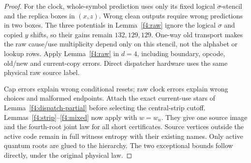 \begin{proof}
For the clock, whole-symbol prediction uses only its fixed logical
\(\sigma\)-stencil and the replica boxes in \((x,z)\). Wrong clean
outputs require wrong predictions in two boxes. The three potentials in
Lemma~\ref{f4:raw} ignore the logical \(\sigma\) and copied \(y\)
shifts, so their gains remain \(132,129,129\). One-way old transport
makes the raw cause/use multiplicity depend only on this stencil,
not the alphabet or lookup rows. Apply Lemma~\ref{f4:raw} in \(d=4\),
including boundary, opcode, old/new and current-copy errors.
Direct dispatcher hardware uses the same physical raw source label.

Cap errors explain wrong conditional resets; raw clock errors explain wrong
choices and malformed endpoints. Attach the exact current-use stars
of Lemma~\ref{f4:dispatch-partial} before selecting the central-strip
cutoff. Lemmas~\ref{f4:strip}--\ref{f4:mixed} now apply with
\(w=w_n\). They give one source image and the fourth-root joint law
for all short certificates. Source vertices outside the active code
remain in full witness entropy with their existing names. Only active
quantum roots are glued to the hierarchy. The two exceptional bounds
follow directly, under the original physical law.
\end{proof}




